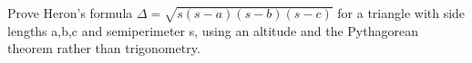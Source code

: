 Prove Heron's formula $\Delta=\sqrt{s(s-a)(s-b)(s-c)}$ for a triangle with side lengths a,b,c and semiperimeter s, using an altitude and the Pythagorean theorem rather than trigonometry.
